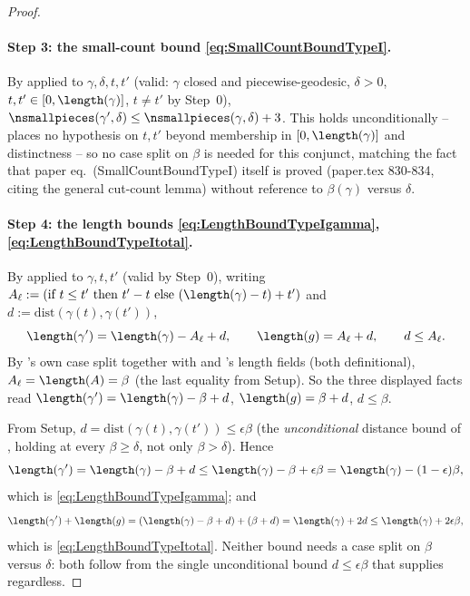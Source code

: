 \begin{proof}
  \paragraph{Step 3: the small-count bound \eqref{eq:SmallCountBoundTypeI}.} By
   applied to $\gamma,\delta,t,t'$ (valid: $\gamma$ closed and
  piecewise-geodesic, $\delta>0$, $t,t'\in[0,\length(\gamma)]$, $t\ne t'$ by Step~0),
  $\nsmallpieces(\gamma',\delta) \le \nsmallpieces(\gamma,\delta)+3$. This holds unconditionally --
   places no hypothesis on $t,t'$ beyond membership in
  $[0,\length(\gamma)]$ and distinctness -- so no case split on $\beta$ is needed for this conjunct,
  matching the fact that paper eq.~(SmallCountBoundTypeI) itself is proved (paper.tex 830-834,
  citing the general cut-count lemma) without reference to $\beta(\gamma)$ versus $\delta$.

  \paragraph{Step 4: the length bounds \eqref{eq:LengthBoundTypeIgamma},
  \eqref{eq:LengthBoundTypeItotal}.} By  applied to $\gamma,t,t'$ (valid by
  Step~0), writing $A_\ell := (\text{if }t\le t'\text{ then }t'-t\text{ else }
  (\length(\gamma)-t)+t')$ and $d:=\mathrm{dist}(\gamma(t),\gamma(t'))$,
  \[
    \length(\gamma') = \length(\gamma)-A_\ell+d , \qquad \length(g) = A_\ell+d , \qquad d\le A_\ell
    .
  \]
  By 's own case split together with  and
  's length fields (both definitional), $A_\ell = \length(A) = \beta$
  (the last equality from Setup). So the three displayed facts read $\length(\gamma') =
  \length(\gamma)-\beta+d$, $\length(g)=\beta+d$, $d\le\beta$.

  From Setup, $d = \mathrm{dist}(\gamma(t),\gamma(t')) \le \epsilon\beta$ (the \emph{unconditional}
  distance bound of , holding at every $\beta\ge\delta$, not only
  $\beta>\delta$). Hence
  \[
    \length(\gamma') = \length(\gamma)-\beta+d \le \length(\gamma)-\beta+\epsilon\beta =
    \length(\gamma)-(1-\epsilon)\beta
    ,
  \]
  which is \eqref{eq:LengthBoundTypeIgamma}; and
  \[
    \length(\gamma')+\length(g) = (\length(\gamma)-\beta+d)+(\beta+d) = \length(\gamma)+2d \le
    \length(\gamma)+2\epsilon\beta
    ,
  \]
  which is \eqref{eq:LengthBoundTypeItotal}. Neither bound needs a case split on $\beta$ versus
  $\delta$: both follow from the single unconditional bound $d\le\epsilon\beta$ that
   supplies regardless.


\end{proof}
